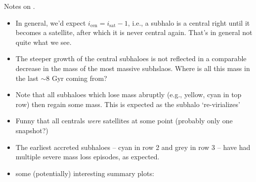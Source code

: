 \documentclass[usenatbib,fleqn]{mnras}
\newcommand{\Msun}{\mathrm{M}_\odot}
\begin{document}
\noindent
Notes on .
\begin{itemize}
  \item In general, we'd expect $i_\mathrm{cen} = i_\mathrm{sat} - 1$, i.e., a subhalo is a central right until it becomes a satellite, after which it is never central again. That's in general not quite what we see.
  \item The steeper growth of the central subhaloes is not reflected in a comparable decrease in the mass of the most massive subhslaos. Where is all this mass in the last $\sim$8 Gyr coming from?
  \item Note that all subhaloes which lose mass abruptly (e.g., yellow, cyan in top row) then regain some mass. This is expected as the subhalo `re-virializes'
  \item Funny that all centrals \emph{were} satellites at some point (probably only one snapshot?)
  \item The earliest accreted subhaloes -- cyan in row 2 and grey in row 3 -- have had multiple severe mass loss episodes, as expected.
  \item some (potentially) interesting summary plots:
%    
\end{itemize}


\end{document}
